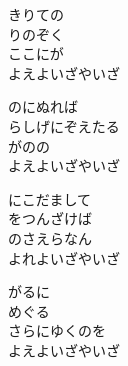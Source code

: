 \documentclass[10pt,b5j]{tarticle} %
\begin{document}
\vspace{1.5em} %
\newcommand{\linespace}{0.5em} %
\newcommand{\blocksize}{0.5\hsize} %
\begin{enumerate} %
    \begin{minipage}[c]{\blocksize}
    
        \vspace{\linespace}
        \item
        きりての\\
        りのぞく\\
        ここにが\\
        よえよいざやいざ
        
        \vspace{\linespace}
        \item
        のにぬれば\\
        らしげにぞえたる\\
        がのの\\
        よえよいざやいざ
        
        \vspace{\linespace}
        \item
        にこだまして\\
        をつんざけば\\
        のさえらなん\\
        よれよいざやいざ
        
        \vspace{\linespace}
        \item
        がるに\\
        めぐる\\
        さらにゆくのを\\
        よえよいざやいざ
    
    \end{minipage}
\end{enumerate} %
\end{document}
